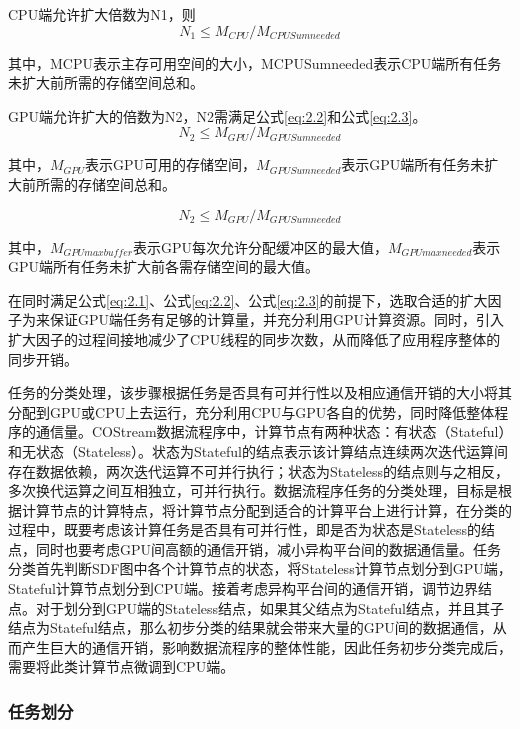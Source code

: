 CPU端允许扩大倍数为N1，则
\begin{equation}
  N_1 \leq M_{CPU} / M_{CPUSumneeded} \label{eq:2.1}
\end{equation}

其中，MCPU表示主存可用空间的大小，MCPUSumneeded表示CPU端所有任务未扩大前所需的存储空间总和。

GPU端允许扩大的倍数为N2，N2需满足公式\ref{eq:2.2}和公式\ref{eq:2.3}。
\begin{equation}
  N_2 \leq M_{GPU} / M_{GPUSumneeded} \label{eq:2.2}
\end{equation}

其中，$M_{GPU}$表示GPU可用的存储空间，$M_{GPUSumneeded}$表示GPU端所有任务未扩大前所需的存储空间总和。

\begin{equation}
  N_2 \leq M_{GPU} / M_{GPUSumneeded} \label{eq:2.3}
\end{equation}

其中，$M_{GPUmaxbuffer}$表示GPU每次允许分配缓冲区的最大值，$M_{GPUmaxneeded}$表示GPU端所有任务未扩大前各需存储空间的最大值。

在同时满足公式\ref{eq:2.1}、公式\ref{eq:2.2}、公式\ref{eq:2.3}的前提下，选取合适的扩大因子为来保证GPU端任务有足够的计算量，并充分利用GPU计算资源。同时，引入扩大因子的过程间接地减少了CPU线程的同步次数，从而降低了应用程序整体的同步开销。

任务的分类处理，该步骤根据任务是否具有可并行性以及相应通信开销的大小将其分配到GPU或CPU上去运行，充分利用CPU与GPU各自的优势，同时降低整体程序的通信量。COStream数据流程序中，计算节点有两种状态：有状态（Stateful）和无状态（Stateless）。状态为Stateful的结点表示该计算结点连续两次迭代运算间存在数据依赖，两次迭代运算不可并行执行；状态为Stateless的结点则与之相反，多次换代运算之间互相独立，可并行执行。数据流程序任务的分类处理，目标是根据计算节点的计算特点，将计算节点分配到适合的计算平台上进行计算，在分类的过程中，既要考虑该计算任务是否具有可并行性，即是否为状态是Stateless的结点，同时也要考虑GPU间高额的通信开销，减小异构平台间的数据通信量。任务分类首先判断SDF图中各个计算节点的状态，将Stateless计算节点划分到GPU端，Stateful计算节点划分到CPU端。接着考虑异构平台间的通信开销，调节边界结点。对于划分到GPU端的Stateless结点，如果其父结点为Stateful结点，并且其子结点为Stateful结点，那么初步分类的结果就会带来大量的GPU间的数据通信，从而产生巨大的通信开销，影响数据流程序的整体性能，因此任务初步分类完成后，需要将此类计算节点微调到CPU端。

\subsubsection{任务划分}

